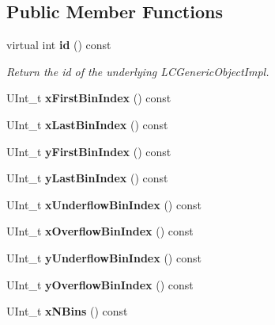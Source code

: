 \subsection*{Public Member Functions}
\begin{DoxyCompactItemize}
\item 
virtual int {\bf id} () const \label{classhistmgr_1_1Histogram2D_a76da2e4085a49feffbcf45457b55634d}

\begin{DoxyCompactList}\small\item\em Return the id of the underlying L\-C\-Generic\-Object\-Impl. \end{DoxyCompactList}\item 
U\-Int\-\_\-t {\bfseries x\-First\-Bin\-Index} () const \label{classhistmgr_1_1Histogram2D_abf70969b4294719fb4c480d2485b6f02}

\item 
U\-Int\-\_\-t {\bfseries x\-Last\-Bin\-Index} () const \label{classhistmgr_1_1Histogram2D_aa816778d15e7eb3b9ab2affa02ceae0c}

\item 
U\-Int\-\_\-t {\bfseries y\-First\-Bin\-Index} () const \label{classhistmgr_1_1Histogram2D_a3e3a5b7d3d907c8be90ca562a2ea832c}

\item 
U\-Int\-\_\-t {\bfseries y\-Last\-Bin\-Index} () const \label{classhistmgr_1_1Histogram2D_af850544bb3c6d6a278e518a4ba7c5146}

\item 
U\-Int\-\_\-t {\bfseries x\-Underflow\-Bin\-Index} () const \label{classhistmgr_1_1Histogram2D_ac6e27ddf89725fe49eeaf1568c8024c2}

\item 
U\-Int\-\_\-t {\bfseries x\-Overflow\-Bin\-Index} () const \label{classhistmgr_1_1Histogram2D_a6eb4490be5315d81c344a6e17d6cd1f6}

\item 
U\-Int\-\_\-t {\bfseries y\-Underflow\-Bin\-Index} () const \label{classhistmgr_1_1Histogram2D_a09627b05e21e4544e621efc423936c81}

\item 
U\-Int\-\_\-t {\bfseries y\-Overflow\-Bin\-Index} () const \label{classhistmgr_1_1Histogram2D_a994f0c6eaf2179019ad0202282b73c80}

\item 
U\-Int\-\_\-t {\bfseries x\-N\-Bins} () const \label{classhistmgr_1_1Histogram2D_a955bc09c119a9ccf995c40d055556250}


\end{DoxyCompactItemize}

